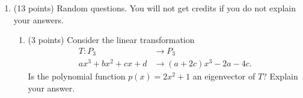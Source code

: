 \documentclass[11pt]{article}
\begin{document}
\begin{enumerate}
\begin{comment}
\begin{enumerate}
\item Straightforward
\item A polynomial function $ax^3+bx^2+cx+d$ is in  $\text{Ker}(T)$ if and only if 
$c+d=0, \ b=0 \text{ and } -c-d=0$
so if and only if $ \begin{pmatrix} a\\ b \\ c\\ d \end{pmatrix}=a\begin{pmatrix} 1\\ 0 \\ 0\\ 0 \end{pmatrix}+ c\begin{pmatrix} 0\\ 0 \\ 1\\-1 \end{pmatrix}.$ Therefore, the  basis for $\text{Ker}(T)$ consists of the polynomial functions $x^3$ and $x-1$.
\item Set of four linearly independent vectors in a vector space of dimension four so basis.
\item Find $[T]^{\alpha}_{\alpha}=\begin{pmatrix} \frac{1}{2}&0&0&\frac{1}{2}\\ -\frac{1}{2}&1&2&\frac{1}{2} \\ -\frac{1}{2}&0&0&-\frac{1}{2}\\ \frac{1}{2}&0&0&\frac{1}{2} \end{pmatrix}$.
\item $[T(p)]_{\alpha}=\begin{pmatrix} 1 \\ 0 \\ -1 \\ 1 \end{pmatrix}$
\end{enumerate}
\end{comment}


\newpage
\item (13 points) Random questions. You will not get credits if you do not explain your answers.
\begin{enumerate} 
\item (3 points) Consider the linear transformation 
\begin{align*}
T:P_3 &\longrightarrow P_3\\
ax^3+bx^2+cx+d &\longrightarrow (a+2c)x^3-2a-4c.
\end{align*} Is the polynomial function $p(x)=2x^2+1$ an eigenvector of $T$? Explain your answer. \\


\end{enumerate}
\end{enumerate}
\end{document}

